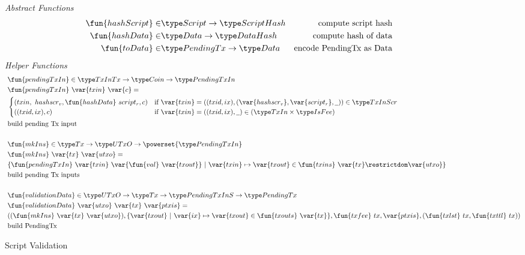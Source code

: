 %
\begin{figure*}[htb]
  \emph{Abstract Functions}
  \begin{align*}
    \fun{hashScript} \in & \Script\to \HashScr & \text{compute script hash} \\
    \fun{hashData} \in & \Data \to \HashDat
    & \text{compute hash of data} \\
    \fun{toData} \in & \PendingTx\to \Data
    & \text{encode PendingTx as Data} \\
  \end{align*}
  \emph{Helper Functions}
  \begin{align*}
    & \fun{pendingTxIn} \in \TxInTx \to \Coin \to \PendingTxIn \\
    & \fun{pendingTxIn}~\var{txin}~\var{c} = \\
    & \begin{cases}
          (txin,~{hashscr_v},\fun{hashData}~{script_r},c)
           & \text{if}~\var{txin} = ((txid,ix),(\var{hashscr_v}, \var{script_r},\wcard)) \in \TxInScr \\
          ((txid,ix),c) & \text{if}~
           \var{txin} = ((txid,ix),\wcard) \in (\TxIn \times \IsFee)
      \end{cases}\\
    & \text{build pending Tx input} \\~\\
    & \fun{mkIns} \in \Tx \to \UTxO \to \powerset{\PendingTxIn} \\
    & \fun{mkIns}~\var{tx}~\var{utxo} = \\
    & \{ \fun{pendingTxIn}~\var{txin}~\var{\fun{val}~\var{txout}} ~\vert~ \var{txin} \mapsto \var{txout}
    \in \fun{txins}~\var{tx} \restrictdom \var{utxo}\} \\
    & \text{build pending Tx inputs} \\~\\
    & \fun{validationData} \in \UTxO \to \Tx \to \PendingTxInS \to \PendingTx \\
    & \fun{validationData}~\var{utxo}~\var{tx}~\var{ptxis} = \\ &
    ((\fun{mkIns}~\var{tx}~\var{utxo}),\{ \var{txout}~\vert~ \var{ix} \mapsto \var{txout} \in \fun{txouts}~\var{tx}\},
    \fun{txfee}~{tx},\var{ptxis},(\fun{txlst}~{tx},\fun{txttl}~{tx})) \\
    & \text{build PendingTx} \\
  \end{align*}
  \caption{Script Validation}
  \label{fig:defs:functions-helper}
\end{figure*}
